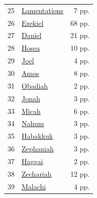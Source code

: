 \documentclass[10pt,letterpaper]{article}
\begin{document}
\begin{minipage}[t]{0.485\textwidth}
\begin{tabularx}{\linewidth}{r X r}
25 & \href{books/25_Lamentations.pdf}{Lamentations} & 7 pp. \\
26 & \href{books/26_Ezekiel.pdf}{Ezekiel} & 68 pp. \\
27 & \href{books/27_Daniel.pdf}{Daniel} & 21 pp. \\
28 & \href{books/28_Hosea.pdf}{Hosea} & 10 pp. \\
29 & \href{books/29_Joel.pdf}{Joel} & 4 pp. \\
30 & \href{books/30_Amos.pdf}{Amos} & 8 pp. \\
31 & \href{books/31_Obadiah.pdf}{Obadiah} & 2 pp. \\
32 & \href{books/32_Jonah.pdf}{Jonah} & 3 pp. \\
33 & \href{books/33_Micah.pdf}{Micah} & 6 pp. \\
34 & \href{books/34_Nahum.pdf}{Nahum} & 3 pp. \\
35 & \href{books/35_Habakkuk.pdf}{Habakkuk} & 3 pp. \\
36 & \href{books/36_Zephaniah.pdf}{Zephaniah} & 3 pp. \\
37 & \href{books/37_Haggai.pdf}{Haggai} & 2 pp. \\
38 & \href{books/38_Zechariah.pdf}{Zechariah} & 12 pp. \\
39 & \href{books/39_Malachi.pdf}{Malachi} & 4 pp. \\
\bottomrule
\end{tabularx}
\end{minipage}\hfill
\end{document}
